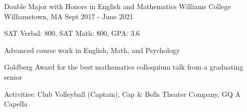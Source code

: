 \begin{cventries}
  \cventry
    {Double Major with Honors in English and Mathematics}
    {Williams College}
    {Williamstown, MA}
    {Sept 2017 - June 2021}
    {
    \begin{cvitems}
      \item {SAT Verbal: 800, SAT Math: 800, GPA: 3.6}
      \item {Advanced course work in English, Math, and Psychology}
      \item {Goldberg Award for the best mathematics colloquium talk from a graduating senior}
      \item {Activities: Club Volleyball (Captain), Cap \& Bells Theater Company, GQ A Capella}
    \end{cvitems}
    }
\end{cventries}
